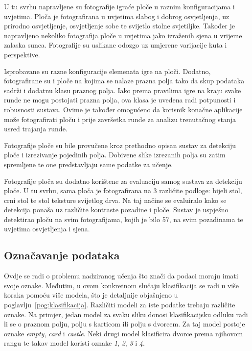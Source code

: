 \documentclass[diplomskirad]{fer}
\begin{document}
		U tu svrhu napravljene su fotografije igraće ploče u raznim konfiguracijama i uvjetima. Ploča je fotografirana u uvjetima slabog i dobrog osvjetljenja, uz prirodno osvjetljenje, osvjetljenje sobe te svijetlo stolne svjetiljke. Također je napravljeno nekoliko fotografija ploče u uvjetima jako izraženih sjena u vrijeme zalaska sunca. Fotografije su uslikane odozgo uz umjerene varijacije kuta i perspektive.
		
		Isprobavane su razne konfiguracije elemenata igre na ploči. Dodatno, fotografirane su i ploče na kojima se nalaze prazna polja tako da skup podataka sadrži i dodatnu klasu praznog polja. Iako prema pravilima igre na kraju svake runde ne mogu postojati prazna polja, ova klasa je uvedena radi potpunosti i robusnosti sustava. Ovime je također omogućeno da korisnik konačne aplikacije može fotografirati ploču i prije završetka runde za analizu trenutačnog stanja usred trajanja runde.
		
		Fotografije ploče su bile provučene kroz prethodno opisan sustav za detekciju ploče i izrezivanje pojedinih polja. Dobivene slike izrezanih polja su zatim spremljene te one predstavljaju same podatke za učenje.
		
		Fotografije ploča su dodatno korištene za evaluaciju samog sustava za detekciju ploče. U tu svrhu, sama ploča je fotografirana na 3 različite podloge: bijeli stol, crni stol te stol teksture svijetlog drva. Na taj načine se evaluiralo kako se detekcija ponaša uz različite kontraste pozadine i ploče. Sustav je uspješno detektirao ploču na svim fotografijama, kojih je bilo 57, na svim pozadinama te uvjetima osvjetljenja i sjena.
		
		\subsection{Označavanje podataka} %
		\label{podpog:oznacanjavnje}
			Ovdje se radi o problemu nadziranog učenja što znači da podaci moraju imati svoje oznake. Međutim, u ovom konkretnom slučaju klasifikacija se radi u više koraka pomoću više modela, što je detaljnije objašnjeno u poglavlju~\ref{pog:klasifikacija}. Različiti modeli za iste podatke trebaju različite oznake. Na primjer, jedan model za svaku sliku donosi klasifikacijsku odluku radi li se o praznom polju, polju s karticom ili polju s dvorcem. Za taj model postoje oznake \textit{empty}, \textit{card} i \textit{castle}. Neki drugi model klasificira dvorce prema njihovom rangu te takav model koristi oznake \textit{1}, \textit{2}, \textit{3} i \textit{4}.
			
\end{document}
